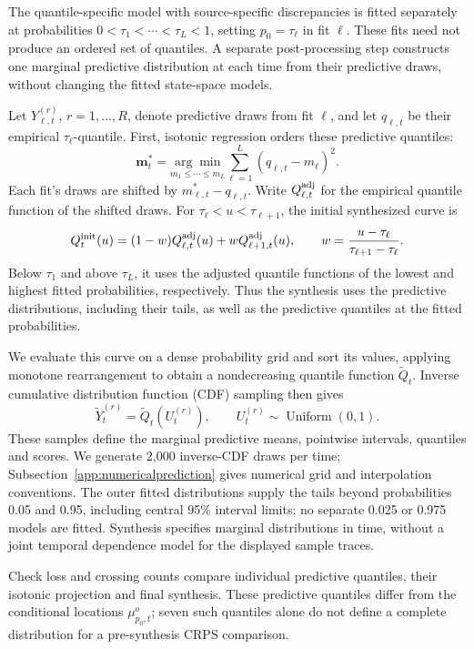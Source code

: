 \documentclass[APA,STIX1COL]{WileyNJD-v2}
\begin{document}
The quantile-specific model with source-specific discrepancies is fitted separately at probabilities \(0<\tau_1<\cdots<\tau_L<1\), setting \(p_0=\tau_\ell\) in fit \(\ell\). These fits need not produce an ordered set of quantiles. A separate post-processing step constructs one marginal predictive distribution at each time from their predictive draws, without changing the fitted state-space models.

Let \(Y_{\ell,t}^{(r)}\), \(r=1,\ldots,R\), denote predictive draws from fit \(\ell\), and let \(q_{\ell,t}\) be their empirical \(\tau_\ell\)-quantile. First, isotonic regression \citep{barlow1972} orders these predictive quantiles:
\[
\mathbf m_t^*=\underset{m_1\le\cdots\le m_L}{\arg\min}
\sum_{\ell=1}^L(q_{\ell,t}-m_\ell)^2.
\]
Each fit's draws are shifted by \(m_{\ell,t}^*-q_{\ell,t}\). Write \(Q^{\rm adj}_{\ell,t}\) for the empirical quantile function of the shifted draws. For \(\tau_\ell<u<\tau_{\ell+1}\), the initial synthesized curve is
\[
Q_t^{\rm init}(u)=(1-w)Q^{\rm adj}_{\ell,t}(u)+wQ^{\rm adj}_{\ell+1,t}(u),
\qquad w=\frac{u-\tau_\ell}{\tau_{\ell+1}-\tau_\ell}.
\]
Below \(\tau_1\) and above \(\tau_L\), it uses the adjusted quantile functions of the lowest and highest fitted probabilities, respectively. Thus the synthesis uses the predictive distributions, including their tails, as well as the predictive quantiles at the fitted probabilities.

We evaluate this curve on a dense probability grid and sort its values, applying monotone rearrangement \citep{chernozhukov2010} to obtain a nondecreasing quantile function \(\widetilde Q_t\). Inverse cumulative distribution function (CDF) sampling then gives
\[
\widetilde Y_t^{(r)}=\widetilde Q_t(U_t^{(r)}),\qquad
U_t^{(r)}\sim\operatorname{Uniform}(0,1).
\]
These samples define the marginal predictive means, pointwise intervals, quantiles and scores. We generate 2,000 inverse-CDF draws per time; Subsection~\ref{app:numericalprediction} gives numerical grid and interpolation conventions. The outer fitted distributions supply the tails beyond probabilities 0.05 and 0.95, including central 95\% interval limits; no separate 0.025 or 0.975 models are fitted. Synthesis specifies marginal distributions in time, without a joint temporal dependence model for the displayed sample traces.

Check loss and crossing counts compare individual predictive quantiles, their isotonic projection and final synthesis. These predictive quantiles differ from the conditional locations $\mu^o_{p_0,t}$; seven such quantiles alone do not define a complete distribution for a pre-synthesis CRPS comparison.
\end{document}
